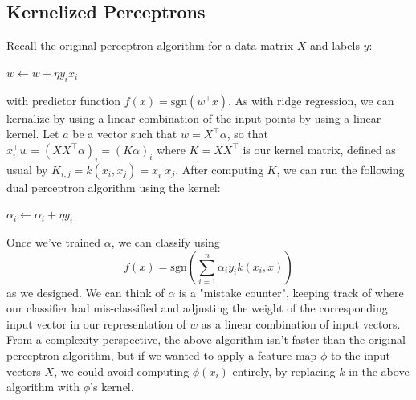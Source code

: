 \documentclass{article}
\begin{document}
\subsection{Kernelized Perceptrons}
Recall the original perceptron algorithm for a data matrix $ X $ and labels $ y $:
\begin{algorithmic}
            \State $ w \gets w + \eta y_i x_i $
        \EndWhile
    \EndProcedure
\end{algorithmic}
with predictor function $ f(x) = \text{sgn}(w^\intercal x) $. As with ridge regression, we can kernalize by using a linear combination of the input points by using a linear kernel. Let $ a $ be a vector such that $ w = X^\intercal \alpha $, so that $ x_i^\intercal w = (X X^\intercal \alpha)_i = (K \alpha)_i $ where $ K = X X^\intercal $ is our kernel matrix, defined as usual by $ K_{i, j} = k(x_i, x_j) = x_i^\intercal x_j $. After computing $ K $, we can run the following dual perceptron algorithm using the kernel:
\begin{algorithmic}
            \State $ \alpha_i \gets \alpha_i + \eta y_i $
        \EndWhile
    \EndProcedure
\end{algorithmic}
Once we've trained $ \alpha $, we can classify using
$$ f(x) = \text{sgn} \left( \sum_{i = 1}^n \alpha_i y_i k(x_i, x) \right) $$
as we designed. We can think of $ \alpha $ is a "mistake counter", keeping track of where our classifier had mis-classified and adjusting the weight of the corresponding input vector in our representation of $ w $ as a linear combination of input vectors. From a complexity perspective, the above algorithm isn't faster than the original perceptron algorithm, but if we wanted to apply a feature map $ \phi $ to the input vectors $ X $, we could avoid computing $ \phi(x_i) $ entirely, by replacing $ k $ in the above algorithm with $ \phi $'s kernel.
\end{document}
